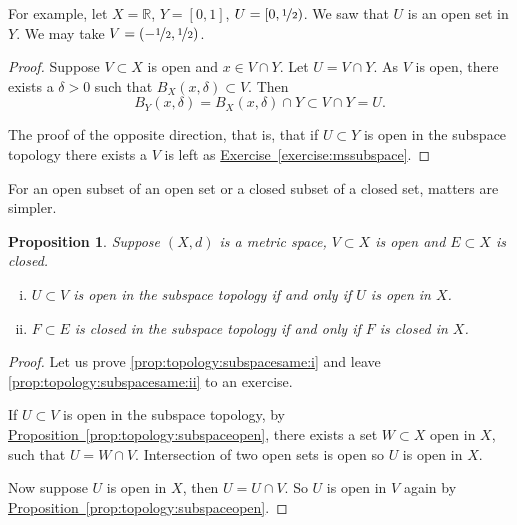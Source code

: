 \documentclass[12pt,openany]{book}
\newcommand{\R}{{\mathbb{R}}}
\theoremstyle{plain}
\newtheorem{prop}[thm]{Proposition}
\theoremstyle{remark}
\theoremstyle{definition}
\theoremstyle{exercise}
\theoremstyle{example}
\newcommand{\exerciseref}[1]{\hyperref[#1]{Exercise~\ref*{#1}}}
\newcommand{\propref}[1]{\hyperref[#1]{Proposition~\ref*{#1}}}
\begin{document}
For example, let $X = \R$, $Y=[0,1]$, $U = [0,\nicefrac{1}{2})$.
We saw that $U$ is an open set in $Y$.
We may take $V = (-\nicefrac{1}{2},\nicefrac{1}{2})$.

\begin{proof}
Suppose $V \subset X$ is open and $x \in V \cap Y$.
Let $U = V \cap Y$.
As $V$ is open, there
exists a $\delta > 0$ such that $B_X(x,\delta) \subset V$.
Then
\begin{equation*}
B_Y(x,\delta) = B_X(x,\delta) \cap Y \subset V \cap Y = U .
\end{equation*}

The proof of the opposite direction, that is, that if $U \subset Y$
is open in the subspace topology there exists a $V$ is left as
\exerciseref{exercise:mssubspace}.
\end{proof}


For an open subset of an open set or a closed subset of a closed
set, matters are simpler.

\begin{prop} \label{prop:topology:subspacesame}
Suppose $(X,d)$ is a metric space, $V \subset X$ is open
and $E \subset X$ is closed.
\begin{enumerate}[(i)]
\item \label{prop:topology:subspacesame:i}
$U \subset V$ is open in the subspace topology if and only if $U$ is open
in $X$.
\item \label{prop:topology:subspacesame:ii}
$F \subset E$ is closed in the subspace topology if and only if $F$ is
closed in $X$.
\end{enumerate}
\end{prop}

\begin{proof}
Let us prove
\ref{prop:topology:subspacesame:i}
and leave 
\ref{prop:topology:subspacesame:ii} to an exercise.

If $U \subset V$ is open in the subspace topology, by
\propref{prop:topology:subspaceopen}, there exists a set $W \subset X$
open in $X$, such that $U = W \cap V$.  Intersection of two open sets
is open so $U$ is open in $X$.

Now suppose $U$ is open in $X$, then $U = U \cap V$. So
$U$ is open in $V$ again by \propref{prop:topology:subspaceopen}.
\end{proof}
\end{document}
